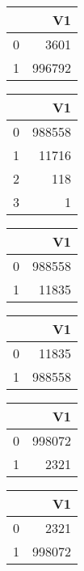 \bigskip\bigskip
\centering
\begin{tabular}{rr}
  \hline
 & V1 \\ 
  \hline
0 & 3601 \\ 
  1 & 996792 \\ 
   \hline
\end{tabular}

\bigskip\bigskip
\centering
\begin{tabular}{rr}
  \hline
 & V1 \\ 
  \hline
0 & 988558 \\ 
  1 & 11716 \\ 
  2 & 118 \\ 
  3 &   1 \\ 
   \hline
\end{tabular}

\bigskip\bigskip
\centering
\begin{tabular}{rr}
  \hline
 & V1 \\ 
  \hline
0 & 988558 \\ 
  1 & 11835 \\ 
   \hline
\end{tabular}

\bigskip\bigskip
\centering
\begin{tabular}{rr}
  \hline
 & V1 \\ 
  \hline
0 & 11835 \\ 
  1 & 988558 \\ 
   \hline
\end{tabular}

\bigskip\bigskip
\centering
\begin{tabular}{rr}
  \hline
 & V1 \\ 
  \hline
0 & 998072 \\ 
  1 & 2321 \\ 
   \hline
\end{tabular}

\bigskip\bigskip
\centering
\begin{tabular}{rr}
  \hline
 & V1 \\ 
  \hline
0 & 2321 \\ 
  1 & 998072 \\ 
   \hline
\end{tabular}

